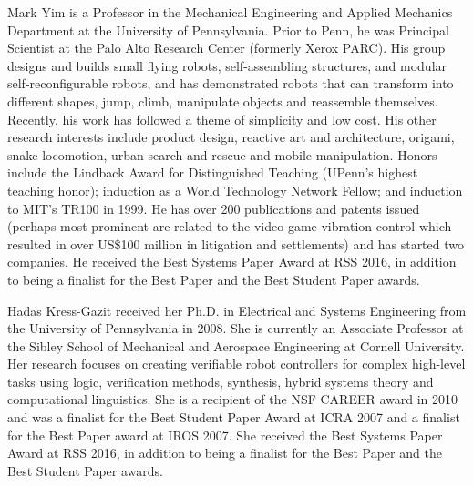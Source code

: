 \documentclass[journal]{IEEEtran}
\begin{document}
\begin{IEEEbiographynophoto}{Mark Yim}
is a Professor in the Mechanical Engineering and Applied Mechanics Department at the University of Pennsylvania.  Prior to Penn, he was Principal Scientist at the Palo Alto Research Center (formerly Xerox PARC).  His group designs and builds small flying robots, self-assembling structures, and modular self-reconfigurable robots, and has demonstrated robots that can transform into different shapes, jump, climb, manipulate objects and reassemble themselves.  Recently, his work has followed a theme of simplicity and low cost.  His other research interests include product design, reactive art and architecture, origami, snake locomotion, urban search and rescue and mobile manipulation.  Honors include the Lindback Award for Distinguished Teaching (UPenn's highest teaching honor); induction as a World Technology Network Fellow; and induction to MIT's TR100 in 1999.  He has over 200 publications and patents issued (perhaps most prominent are related to the video game vibration control which resulted in over US\$100 million in litigation and settlements) and has started two companies. He received the Best Systems Paper Award at RSS 2016, in addition to being a finalist for the Best Paper and the Best Student Paper awards.
\end{IEEEbiographynophoto}

\begin{IEEEbiographynophoto}{Hadas Kress-Gazit}
received her Ph.D. in Electrical and Systems Engineering from the University of Pennsylvania in 2008. She is currently an Associate Professor at the Sibley School of Mechanical and Aerospace Engineering at Cornell University. Her research focuses on creating verifiable robot controllers for complex high-level tasks using logic, verification methods, synthesis, hybrid systems theory and computational linguistics. She is a recipient of the NSF CAREER award in 2010 and was a finalist for the Best Student Paper Award at ICRA 2007 and a finalist for the Best Paper award at IROS 2007. She received the Best Systems Paper Award at RSS 2016, in addition to being a finalist for the Best Paper and the Best Student Paper awards.
\end{IEEEbiographynophoto}
\end{document}
